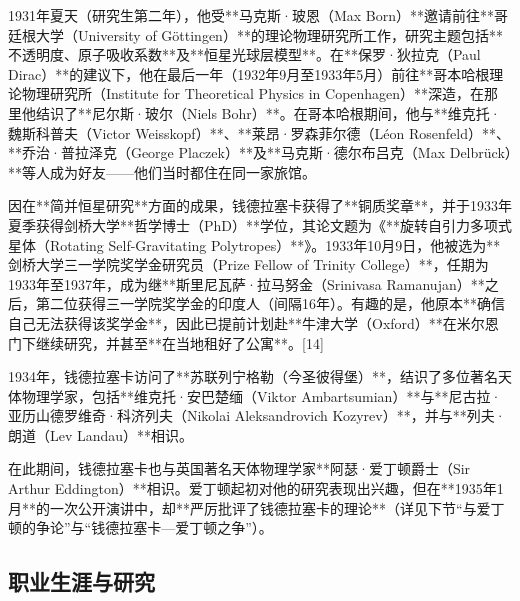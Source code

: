 1931年夏天（研究生第二年），他受**马克斯·玻恩（Max Born）**邀请前往**哥廷根大学（University of Göttingen）**的理论物理研究所工作，研究主题包括**不透明度、原子吸收系数**及**恒星光球层模型**。在**保罗·狄拉克（Paul Dirac）**的建议下，他在最后一年（1932年9月至1933年5月）前往**哥本哈根理论物理研究所（Institute for Theoretical Physics in Copenhagen）**深造，在那里他结识了**尼尔斯·玻尔（Niels Bohr）**。在哥本哈根期间，他与**维克托·魏斯科普夫（Victor Weisskopf）**、**莱昂·罗森菲尔德（Léon Rosenfeld）**、**乔治·普拉泽克（George Placzek）**及**马克斯·德尔布吕克（Max Delbrück）**等人成为好友——他们当时都住在同一家旅馆。

因在**简并恒星研究**方面的成果，钱德拉塞卡获得了**铜质奖章**，并于1933年夏季获得剑桥大学**哲学博士（PhD）**学位，其论文题为《**旋转自引力多项式星体（Rotating Self-Gravitating Polytropes）**》。1933年10月9日，他被选为**剑桥大学三一学院奖学金研究员（Prize Fellow of Trinity College）**，任期为1933年至1937年，成为继**斯里尼瓦萨·拉马努金（Srinivasa Ramanujan）**之后，第二位获得三一学院奖学金的印度人（间隔16年）。有趣的是，他原本**确信自己无法获得该奖学金**，因此已提前计划赴**牛津大学（Oxford）**在米尔恩门下继续研究，并甚至**在当地租好了公寓**。[14]

1934年，钱德拉塞卡访问了**苏联列宁格勒（今圣彼得堡）**，结识了多位著名天体物理学家，包括**维克托·安巴楚缅（Viktor Ambartsumian）**与**尼古拉·亚历山德罗维奇·科济列夫（Nikolai Aleksandrovich Kozyrev）**，并与**列夫·朗道（Lev Landau）**相识。

在此期间，钱德拉塞卡也与英国著名天体物理学家**阿瑟·爱丁顿爵士（Sir Arthur Eddington）**相识。爱丁顿起初对他的研究表现出兴趣，但在**1935年1月**的一次公开演讲中，却**严厉批评了钱德拉塞卡的理论**（详见下节“与爱丁顿的争论”与“钱德拉塞卡—爱丁顿之争”）。
\subsection{职业生涯与研究}

